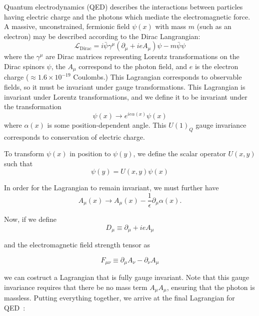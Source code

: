 Quantum electrodynamics (QED) describes the interactions between particles having electric charge and the photons which mediate the electromagnetic force. A massive, unconstrained, fermionic field $\psi(x)$ with mass $m$ (such as an electron) may be described according to the Dirac Langrangian\cite{srednicki}:
\begin{equation}
\mathcal{L}_{\text{Dirac}} = i\bar{\psi}\gamma^{\mu}\left(\partial_{\mu} + ieA_{\mu}\right)\psi - m\bar{\psi}\psi
\end{equation}
where the $\gamma^{\mu}$ are Dirac matrices representing Lorentz transformations on the Dirac spinors $\psi$, the $A_{\mu}$ correspond to the photon field, and $e$ is the electron charge ($\approx 1.6 \times 10^{-19}$ Coulombs.) This Lagrangian corresponds to observable fields, so it must be invariant under gauge transformations. This Lagrangian is invariant under Lorentz transformations, and we define it to be invariant under the transformation
\begin{equation}
\psi(x) \to e^{ie\alpha(x)}\psi(x)
\end{equation}
where $\alpha(x)$ is some position-dependent angle. This $U(1)_Q$ gauge invariance corresponds to conservation of electric charge.

To transform $\psi(x)$ in position to $\psi(y)$, we define the scalar operator $U(x, y)$ such that
\begin{equation}
\psi(y) = U(x, y)\psi(x)
\end{equation}

\noindent In order for the Lagrangian to remain invariant, we must further have
\begin{equation}
A_{\mu}(x) \to A_{\mu}(x) - \frac{1}{\epsilon}\partial_{\mu}\alpha(x).
\end{equation}

\noindent Now, if we define
\begin{equation}
D_{\mu} \equiv \partial_{\mu} + ieA_{\mu}
\end{equation}

\noindent and the electromagnetic field strength tensor as

\begin{equation}
 F_{\mu\nu} \equiv \partial_{\mu}A_{\nu} - \partial_{\nu}A_{\mu}
\end{equation}

\noindent we can costruct a Lagrangian that is fully gauge invariant. Note that this gauge invariance requires that there be no mass term $A_{\mu}A_{\mu}$, ensuring that the photon is massless. Putting everything together, we arrive at the final Lagrangian for QED~\cite{halzen}:

